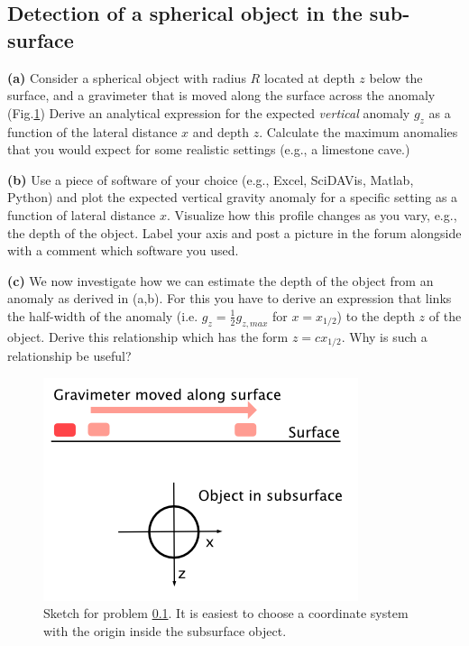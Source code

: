 \documentclass[a4paper,12pt]{article}
\begin{document}
\subsection{Detection of a spherical object in the sub-surface}
\label{Sec:SphereInSubsurface}
\textbf{(a)} Consider a spherical object with radius $R$ located at depth $z$ below the surface, and a gravimeter that is moved along the surface across the anomaly (Fig.\ref{Fig:SphereInSubsurface}) Derive an analytical expression for the expected \textit{vertical} anomaly $g_z$ as a function of the lateral distance $x$ and depth $z$. Calculate the maximum anomalies that you would expect for some realistic settings (e.g., a limestone cave.)

  \textbf{(b)} Use a piece of software of your choice (e.g., Excel, SciDAVis, Matlab, Python) and plot the expected vertical gravity anomaly for a specific setting as a function of lateral distance $x$. Visualize how this profile changes as you vary, e.g., the depth of the object. Label your axis and post a picture in the forum alongside with a comment which software you used.


 \textbf{(c)} We now investigate how we can estimate the depth of the object from an anomaly as derived in (a,b). For this you have to derive an expression that links the half-width of the anomaly (i.e. $g_z = \frac{1}{2}g_{z,max}$ for $x=x_{1/2}$) to the depth $z$ of the object. Derive this relationship which has the form $z = c x_{1/2}$. Why is such a relationship be useful?


\begin{figure}
\centering
\begin{minipage}[c]{0.5\textwidth}
\begin{center}
    \includegraphics[width=\textwidth]{Figures/Gravimetry/Gravimetry01_SphereSketch.png}
\end{center}
\caption{Sketch for problem \ref{Sec:SphereInSubsurface}. It is easiest to choose a coordinate system with the origin inside the subsurface object.}
\label{Fig:SphereInSubsurface}
\end{minipage}
\end{figure}
\end{document}
